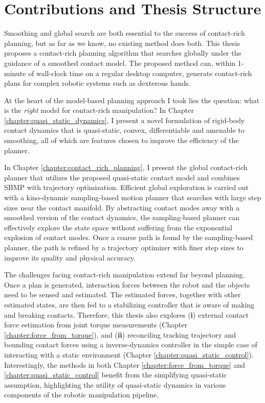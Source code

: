 \section{Contributions and Thesis Structure}
Smoothing and global search are both essential to the success of contact-rich planning, but as far as we know, no existing method does both. This thesis proposes a contact-rich planning algorithm that searches globally under the guidance of a smoothed contact model. The proposed method can, within 1-minute of wall-clock time on a regular desktop computer, generate contact-rich plans for complex robotic systems such as dexterous hands.

At the heart of the model-based planning approach I took lies the question: what is the \emph{right} model for contact-rich manipulation? In Chapter \ref{chapter:quasi_static_dynamics}, I present a novel formulation of rigid-body contact dynamics that is quasi-static, convex, differentiable and amenable to smoothing, all of which are features chosen to improve the efficiency of the planner.

In Chapter \ref{chapter:contact_rich_planning}, I present the global contact-rich planner that utilizes the proposed quasi-static contact model and combines SBMP with trajectory optimization. Efficient global exploration is carried out with a kino-dynamic sampling-based motion planner that searches with large step sizes near the contact manifold. By abstracting contact modes away with a smoothed version of the contact dynamics, the sampling-based planner can effectively explore the state space without suffering from the exponential explosion of contact modes. Once a coarse path is found by the sampling-based planner, the path is refined by a trajectory optimizer with finer step sizes to improve its quality and physical accuracy. 

The challenges facing contact-rich manipulation extend far beyond planning. Once a plan is generated, interaction forces between the robot and the objects need to be sensed and estimated. The estimated forces, together with other estimated states, are then fed to a stabilizing controller that is aware of making and breaking contacts. 
Therefore, this thesis also explores (\textbf{i}) external contact force estimation from joint torque measurements (Chapter \ref{chapter:force_from_torque}), and (\textbf{ii}) reconciling tracking trajectory and bounding contact forces using a inverse-dynamics controller in the simple case of interacting with a static environment (Chapter \ref{chapter:quasi_static_control}). Interestingly, the methods in both Chapter \ref{chapter:force_from_torque} and \ref{chapter:quasi_static_control} benefit from the simplifying quasi-static assumption, highlighting the utility of quasi-static dynamics in various components of the robotic manipulation pipeline. 



